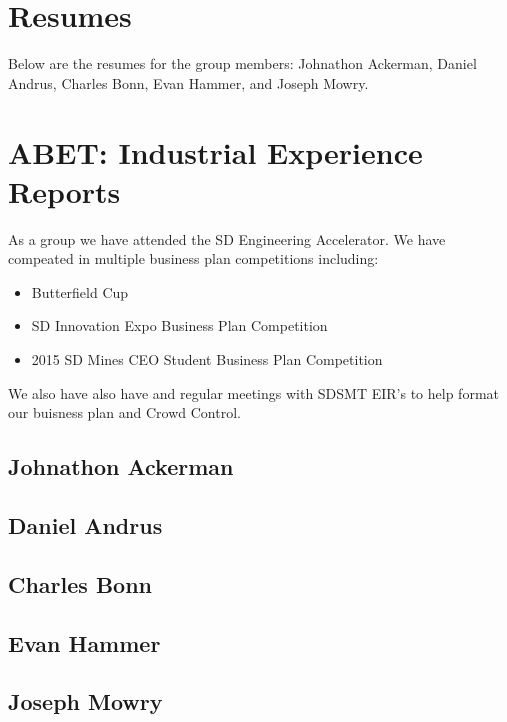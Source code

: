 

\section{Resumes}

Below are the resumes for the group members: Johnathon Ackerman, Daniel Andrus, Charles Bonn, Evan Hammer, and Joseph Mowry.


%     
%     
%     






\section{ABET:  Industrial Experience Reports}
As a group we have attended the  SD Engineering Accelerator. We have compeated in multiple business plan competitions including:
	\begin{itemize}
	\item{Butterfield Cup}
	\item{SD Innovation Expo Business Plan Competition}
	\item{2015 SD Mines CEO Student Business Plan Competition}
	\end{itemize}
We also have also have and regular meetings with SDSMT EIR's to help format our buisness plan and Crowd Control.

\subsection{Johnathon Ackerman}

\subsection{Daniel Andrus}

\subsection{Charles Bonn}

\subsection{Evan Hammer}

\subsection{Joseph Mowry}




